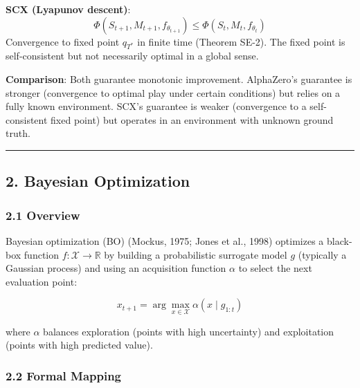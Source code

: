 \documentclass[
  12pt,
]{article}
\begin{document}
\textbf{SCX (Lyapunov descent)}:
\[\Phi(S_{t+1}, M_{t+1}, f_{\theta_{t+1}}) \leq \Phi(S_t, M_t, f_{\theta_t})\]
Convergence to fixed point \(q_{T^*}\) in finite time (Theorem SE-2).
The fixed point is self-consistent but not necessarily optimal in a
global sense.

\textbf{Comparison}: Both guarantee monotonic improvement. AlphaZero's
guarantee is stronger (convergence to optimal play under certain
conditions) but relies on a fully known environment. SCX's guarantee is
weaker (convergence to a self-consistent fixed point) but operates in an
environment with unknown ground truth.

\begin{center}\rule{0.5\linewidth}{0.5pt}\end{center}

\subsection{2. Bayesian Optimization}\label{bayesian-optimization}

\subsubsection{2.1 Overview}\label{overview-1}

Bayesian optimization (BO) (Mockus, 1975; Jones et al., 1998) optimizes
a black-box function \(f: \mathcal{X} \to \mathbb{R}\) by building a
probabilistic surrogate model \(g\) (typically a Gaussian process) and
using an acquisition function \(\alpha\) to select the next evaluation
point:

\[x_{t+1} = \arg\max_{x \in \mathcal{X}} \alpha(x \mid g_{1:t})\]

where \(\alpha\) balances exploration (points with high uncertainty) and
exploitation (points with high predicted value).

\subsubsection{2.2 Formal Mapping}\label{formal-mapping-1}
\end{document}
